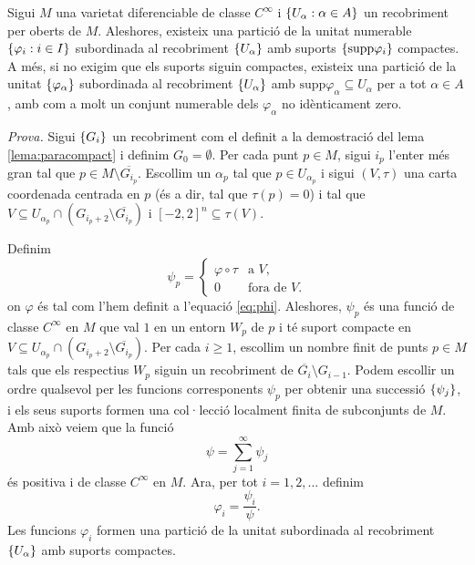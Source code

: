 \begin{teo}

    Sigui $M$ una varietat diferenciable de classe $C^\infty$ i $\{U_\alpha:\alpha\in A\}$ un recobriment per oberts de $M$. Aleshores, existeix una partició de la unitat numerable $\{\varphi_i:i\in I\}$ subordinada al recobriment $\{U_\alpha\}$ amb suports $\{\text{supp}\varphi_i\}$ compactes. A més, si no exigim que els suports siguin compactes, existeix una partició de la unitat $\{\varphi_\alpha\}$ subordinada al recobriment $\{U_\alpha\}$ amb $\text{supp}\varphi_\alpha \subseteq U_\alpha$ per a tot $\alpha\in A$, amb com a molt un conjunt numerable dels $\varphi_\alpha$ no idènticament zero.
\end{teo}

{\color{black} 
    \textit{Prova.} 
    Sigui $\{G_i\}$ un recobriment com el definit a la demostració del lema \ref{lema:paracompact} i definim $G_0=\emptyset$. Per cada punt $p\in M$, sigui $i_p$ l'enter més gran tal que $p\in M\setminus \overline{G_{i_p}}$. Escollim un $\alpha_p$ tal que $p\in U_{\alpha_p}$ i sigui $(V,\tau)$ una carta coordenada centrada en $p$ (és a dir, tal que $\tau(p)=0$) i tal que $V\subseteq U_{\alpha_p}\cap(G_{i_p+2}\setminus \overline{G_{i_p}})$ i $[-2,2]^n\subseteq\tau(V)$.

    Definim 
    \begin{equation*}
        \psi_p = \begin{cases}
            \varphi\circ\tau & \text{a } V, \\
            0 & \text{fora de } V.
        \end{cases}
    \end{equation*}
    on $\varphi$ és tal com l'hem definit a l'equació \eqref{eq:phi}. Aleshores, $\psi_p$ és una funció de classe $C^\infty$ en $M$ que val $1$ en un entorn $W_p$ de $p$ i té suport compacte en $V\subseteq U_{\alpha_p}\cap(G_{i_p+2}\setminus \overline{G_{i_p}})$. Per cada $i\ge1$, escollim un nombre finit de punts $p\in M$ tals que els respectius $W_p$ siguin un recobriment de $\overline{G_i}\setminus G_{i-1}$. Podem escollir un ordre qualsevol per les funcions corresponents $\psi_p$ per obtenir una successió $\{\psi_j\}$, i els seus suports formen una col·lecció localment finita de subconjunts de $M$. Amb això veiem que la funció 
    \begin{equation*}
        \psi = \sum_{j=1}^\infty \psi_j
    \end{equation*}
    és positiva i de classe $C^\infty$ en $M$. Ara, per tot $i=1,2,\dots$ definim 
    \begin{equation*}
        \varphi_i = \frac{\psi_i}{\psi}.
    \end{equation*}
    Les funcions $\varphi_i$ formen una partició de la unitat subordinada al recobriment $\{U_\alpha\}$ amb suports compactes.

}
